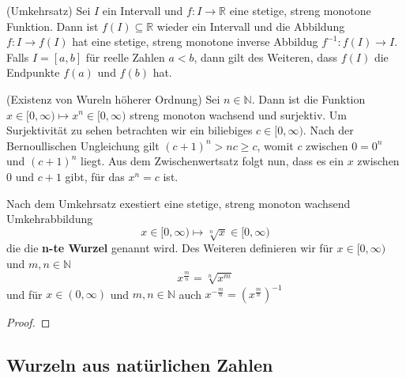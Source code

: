 \documentclass[../Analysis1_script.tex]{subfiles}
\begin{document}
\begin{proposition}{(Umkehrsatz)}
	Sei $I$ ein Intervall und $f : I \to \mathbb{R}$ eine stetige, streng monotone Funktion. Dann ist $f(I) \subseteq \mathbb{R}$ wieder ein Intervall und die Abbildung $f: I \to f(I)$ hat eine stetige, streng monotone inverse Abbildug $f^{-1}: f(I) \to I$. Falls $I = [a, b]$ für reelle Zahlen $a < b$, dann gilt des Weiteren, dass $f(I)$ die Endpunkte $f(a)$ und $f(b)$ hat.
\end{proposition}

\begin{example}{(Existenz von Wureln höherer Ordnung)}
	Sei $n \in \mathbb{N}$. Dann ist die Funktion $x \in [0, \infty) \mapsto x^n \in [0, \infty)$ streng monoton wachsend und surjektiv. Um Surjektivität zu sehen betrachten wir ein biliebiges $c \in [0, \infty)$. Nach der Bernoullischen Ungleichung gilt $(c + 1)^n > nc \geq c$, womit $c$ zwischen $0 = 0^n$ und $(c + 1)^n$ liegt. Aus dem Zwischenwertsatz folgt nun, dass es ein $x$ zwischen $0$ und $c + 1$ gibt, für das $x^n = c$ ist.
	
	Nach dem Umkehrsatz exestiert eine stetige, streng monoton wachsend Umkehrabbildung
	\[x \in [0, \infty) \mapsto \sqrt[n]{x} \in [0, \infty)\]
	die die \textbf{n-te Wurzel} genannt wird. Des Weiteren definieren wir für $x \in [0, \infty)$ und $m, n \in \mathbb{N}$
	\[x^{\frac{m}{n}} = \sqrt[n]{x^m}\]
	und für $x \in (0, \infty)$ und $m, n \in \mathbb{N}$ auch $x^{-\frac{m}{n}} = (x^{\frac{m}{n}})^{-1}$
\end{example}

\begin{proof}
\end{proof}
\subsection{Wurzeln aus natürlichen Zahlen}
\end{document}
